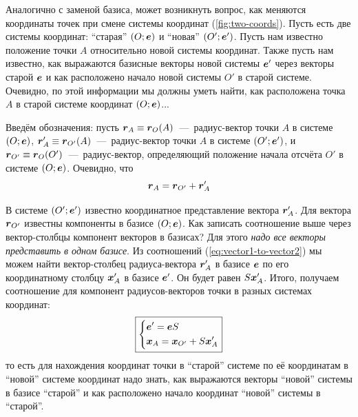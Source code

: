 \documentclass[a4paper,12pt]{article}
\begin{document}
  Аналогично с заменой базиса, может возникнуть вопрос, как меняются координаты точек при смене системы координат (\ref{fig:two-coords}).
  Пусть есть две системы координат: ``старая'' $(O; \boldsymbol e)$ и ``новая'' $(O'; \boldsymbol e')$.
  Пусть нам известно положение точки $A$ относительно новой системы координат.
  Также пусть нам известно, как выражаются базисные векторы новой системы $\boldsymbol e'$ через векторы старой $\boldsymbol e$ и как расположено начало новой системы $O'$ в старой системе.
  Очевидно, по этой информации мы должны уметь найти, как расположена точка $A$ в старой системе координат $(O; \boldsymbol e)$...
  
  Введём обозначения: пусть $\bds r_A \hm\equiv \bds r_O(A)$~---~радиус-вектор точки $A$ в системе $(O; \boldsymbol e)$,
  $\bds r'_A \hm\equiv \bds r_{O'}(A)$~---~радиус-вектор точки $A$ в системе $(O'; \boldsymbol e')$,
  и $\bds r_{O'} \hm\equiv \bds r_O(O')$~---~радиус-вектор, определяющий положение начала отсчёта $O'$ в системе $(O; \boldsymbol e)$.
  Очевидно, что
  \[
    \boldsymbol r_A = \boldsymbol r_{O'} + \boldsymbol r'_A
  \]
  
  В системе $(O'; \boldsymbol e')$ известно координатное представление вектора $\boldsymbol r'_A$.
  Для вектора $\boldsymbol r_{O'}$ известны компоненты в базисе $(O; \boldsymbol e)$.
  Как записать соотношение выше через вектор-столбцы компонент векторов в базисах?
  Для этого \emph{надо все векторы представить в одном базисе}.
  Из соотношений (\ref{eq:vector1-to-vector2}) мы можем найти вектор-столбец радиуса-вектора $\boldsymbol r'_A$ в базисе $\boldsymbol e$ по его координатному столбцу $\boldsymbol x'_A$ в базисе $\boldsymbol e'$.
  Он будет равен $S \boldsymbol x'_A$.
  Итого, получаем соотношение для компонент радиусов-векторов точки в разных системах координат:
  \begin{equation}\label{eq:point1-to-point2}
    \boxed{
      \left\{
        \begin{aligned}
          &\boldsymbol e' = \boldsymbol e S\\
          &\boldsymbol x_A = \boldsymbol x_{O'} + S \boldsymbol x'_A
        \end{aligned}
      \right.
    }
  \end{equation}
  то есть для нахождения координат точки в ``старой'' системе по её координатам в ``новой'' системе координат надо знать, как выражаются векторы ``новой'' системы в базисе ``старой'' и как расположено начало координат ``новой'' системы в ``старой''.
\end{document}
